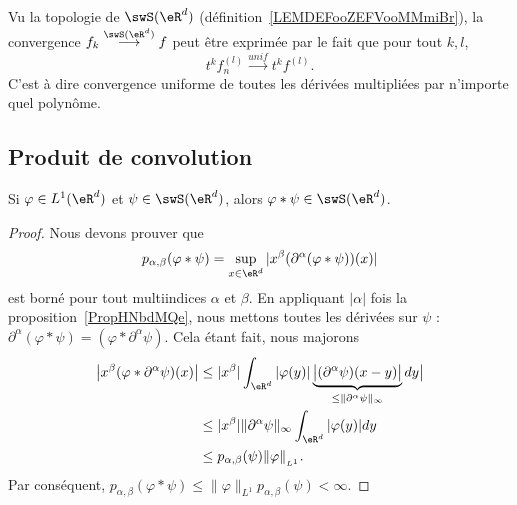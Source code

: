 \begin{remark}
    Vu la topologie de \( \swS(\eR^d)\) (définition~\ref{LEMDEFooZEFVooMMmiBr}), la convergence \( f_k\stackrel{\swS(\eR^d)}{\longrightarrow}f\) peut être exprimée par le fait que pour tout \( k,l\),
    \begin{equation}
        t^kf_n^{(l)}\stackrel{unif}{\longrightarrow}t^kf^{(l)}.
    \end{equation}
    C'est à dire convergence uniforme de toutes les dérivées multipliées par n'importe quel polynôme.
\end{remark}

\subsection{Produit de convolution}

\begin{proposition}     \label{PROPooUNFYooYdbSbJ}
    Si \( \varphi\in L^1(\eR^d)\) et \( \psi\in\swS(\eR^d)\), alors \( \varphi * \psi\in \swS(\eR^d)\).
\end{proposition}

\begin{proof}
    Nous devons prouver que
    \begin{equation}
        p_{\alpha,\beta}(\varphi*\psi)=\sup_{x\in \eR^d}| x^{\beta}(\partial^{\alpha}(\varphi*\psi))(x) |
    \end{equation}
    est borné pour tout multiindices \( \alpha\) et \( \beta\). En appliquant \( | \alpha |\) fois la proposition~\ref{PropHNbdMQe}, nous mettons toutes les dérivées sur \( \psi\) : \( \partial^{\alpha}(\varphi*\psi)=(\varphi*\partial^{\alpha}\psi)\). Cela étant fait, nous majorons
    \begin{subequations}
        \begin{align}
            \big| x^{\beta}(\varphi*\partial^{\alpha}\psi)(x) \big|&\leq| x^{\beta} |\int_{\eR^d} |\varphi(y)|\underbrace{\big| (\partial^{\alpha}\psi)(x-y)\big|}_{\leq\| \partial^{\alpha}\psi \|_{\infty}} dy \big|\\
            &\leq | x^{\beta} |  \| \partial^{\alpha}\psi \|_{\infty}\int_{\eR^d}| \varphi(y) |dy\\
            &\leq p_{\alpha,\beta}(\psi)\| \varphi \|_{_{L^1}}.
        \end{align}
    \end{subequations}
    Par conséquent, \( p_{\alpha,\beta}(\varphi*\psi)\leq \| \varphi \|_{L^1}p_{\alpha,\beta}(\psi)<\infty\).
\end{proof}
